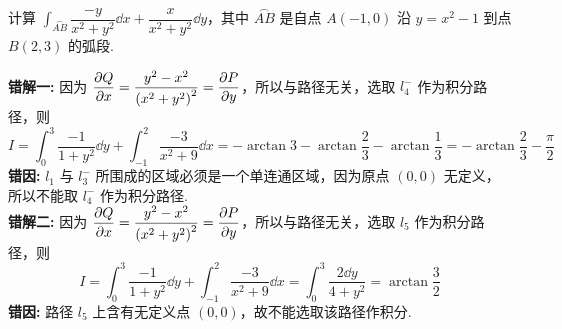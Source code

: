 \begin{example}
    计算 $\displaystyle\int_{\stackrel\frown{AB}}\dfrac{-y}{x^2+y^2}\dd x+\dfrac{x}{x^2+y^2}\dd y$，其中 $\stackrel\frown{AB}$ 是自点 $A(-1,0)$ 沿 $y=x^2-1$ 到点 $B(2,3)$ 的弧段.
\end{example}
\begin{errorSolution}
    \textbf{错解一: }因为 $\displaystyle\pdv{Q}{x}=\dfrac{y^2-x^2}{\qty(x^2+y^2)^2}=\pdv{P}{y}$，所以与路径无关，选取 $l_4^-$ 作为积分路径，则
    $$I=\int_{0}^{3}\dfrac{-1}{1+y^2}\dd y+\int_{-1}^{2}\dfrac{-3}{x^2+9}\dd x=-\arctan 3-\arctan\dfrac{2}{3}-\arctan\dfrac{1}{3}=-\arctan\dfrac{2}{3}-\dfrac{\pi}{2}$$
    \textbf{错因: }$l_1$ 与 $l_3^-$ 所围成的区域必须是一个单连通区域，因为原点 $(0,0)$ 无定义，所以不能取 $l_4^-$ 作为积分路径.\\
    \textbf{错解二: }因为 $\displaystyle\pdv{Q}{x}=\dfrac{y^2-x^2}{\qty(x^2+y^2)^2}=\pdv{P}{y}$，所以与路径无关，选取 $l_5$ 作为积分路径，则
    $$I=\int_{0}^{3}\dfrac{-1}{1+y^2}\dd y+\int_{-1}^{2}\dfrac{-3}{x^2+9}\dd x=\int_{0}^{3}\dfrac{2\dd y}{4+y^2}=\arctan\dfrac{3}{2}$$
    \textbf{错因: }路径 $l_5$ 上含有无定义点 $(0,0)$，故不能选取该路径作积分.\\
\end{errorSolution}
